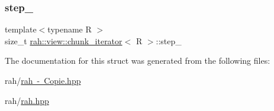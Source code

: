 \mbox{\label{structrah_1_1view_1_1chunk__iterator_a71025fe393b81b113b2773063c4126be}} 
\subsubsection{\texorpdfstring{step\_}{step\_}}
{\footnotesize\ttfamily template$<$typename R $>$ \\
size\+\_\+t \mbox{\hyperlink{structrah_1_1view_1_1chunk__iterator}{rah\+::view\+::chunk\+\_\+iterator}}$<$ R $>$\+::step\+\_\+}



The documentation for this struct was generated from the following files\+:\begin{DoxyCompactItemize}
\item 
rah/\mbox{\hyperlink{rah_01-_01_copie_8hpp}{rah -\/ Copie.\+hpp}}\item 
rah/\mbox{\hyperlink{rah_8hpp}{rah.\+hpp}}\end{DoxyCompactItemize}
